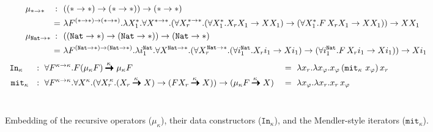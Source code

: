 \begin{landscape}
\begin{figure}
\begin{singlespace}
\begin{align*}
&\mu_{*-> *} &\!\!\!\!\!~:~~& ((* -> *) -> (* -> *)) -> (* -> *) \\
&            &\!\!\!\!\!=~&
  \l F^{(*-> *) -> (*-> *)}.\l X_1^{*}.
   \forall X^{* -> *}.(\forall {X_r}^{\!\!* -> *}.
   (\forall X_1^{*}.X_r X_1 -> X X_1) -> (\forall X_1^{*}.F\,X_r X_1 -> X X_1)) -> X X_1 \\
  &\mu_{\mathtt{Nat}-> *} &\!\!\!\!\!~:~~& ((\mathtt{Nat} -> *) -> (\mathtt{Nat} -> *)) -> (\mathtt{Nat} -> *) \\
&            &\!\!\!\!\!=~&
  \l F^{(\mathtt{Nat}-> *) -> (\mathtt{Nat}-> *)}.\l i_1^\mathtt{Nat}.
  \forall X^{\mathtt{Nat} -> *}.(\forall {X_r}^{\!\!\mathtt{Nat} -> *}.
  (\forall i_1^\mathtt{Nat}.X_r i_1 -> X i_1) -> (\forall i_1^\mathtt{Nat}.F\,X_r i_1 -> X i_1)) -> X i_1 \qquad\qquad
\end{align*}
\begin{align*}
\mathtt{In}_{\kappa} \,~\,&~~:~ \forall F^{\kappa-> \kappa}.
	F(\mu_\kappa F) \stackrel{\kappa\;}{\pmb{\pmb{->}}} \mu_\kappa F
&&=~ \lambda x_r. \lambda x_\varphi.x_\varphi\,(\mathtt{mit}_\kappa~x_\varphi)\,x_r
	\qquad~\qquad~\qquad~\qquad~\quad \\
\mathtt{mit}_\kappa &~~:~ \forall F^{\kappa-> \kappa}.\forall X^\kappa.
	(\forall {X_r}^{\!\!\kappa}.
	 (X_r \stackrel{\kappa\;}{\pmb{\pmb{->}}} X) ->
	 (F X_r \stackrel{\kappa\;}{\pmb{\pmb{->}}} X) ) ->
	(\mu_\kappa F \stackrel{\kappa\;}{\pmb{\pmb{->}}} X)
&&=~ \lambda x_\varphi.\lambda x_r.x_r\,x_\varphi
\end{align*} ~ \vspace*{-10pt}
\end{singlespace}
\caption{Embedding of the recursive operators ($\mu_\kappa$),
	their data constructors ($\mathtt{In}_\kappa$),
	and the Mendler-style iterators ($\mathtt{mit}_\kappa$).}
\label{fig:mu}
\end{figure}
\end{landscape}

